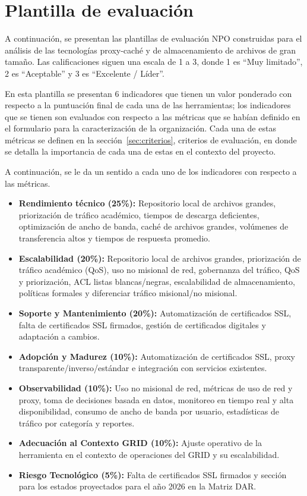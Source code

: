 \section{Plantilla de evaluación}\label{sec:plantilla}

A continuación, se presentan las plantillas de evaluación NPO
construidas para el análisis de las tecnologías proxy-caché y de
almacenamiento de archivos de gran tamaño. Las calificaciones siguen una
escala de 1 a 3, donde 1 es ``Muy limitado'', 2 es ``Aceptable'' y 3 es
``Excelente / Líder''.

En esta plantilla se presentan 6 indicadores que tienen un valor
ponderado con respecto a la puntuación final de cada una de las
herramientas; los indicadores que se tienen son evaluados con respecto a
las métricas que se habían definido en el formulario para la
caracterización de la organización. Cada una de estas métricas se
definen en la sección~\ref{sec:criterios}, criterios de evaluación, en donde se detalla la
importancia de cada una de estas en el contexto del proyecto.

A continuación, se le da un sentido a cada uno de los indicadores con
respecto a las métricas.

\begin{itemize}
\item \textbf{Rendimiento técnico (25\%):} Repositorio local de archivos grandes, priorización de tráfico académico, tiempos de descarga deficientes, optimización de ancho de banda, caché de archivos grandes, volúmenes de transferencia altos y tiempos de respuesta promedio.
\item \textbf{Escalabilidad (20\%):} Repositorio local de archivos grandes, priorización de tráfico académico (QoS), uso no misional de red, gobernanza del tráfico, QoS y priorización, ACL listas blancas/negras, escalabilidad de almacenamiento, políticas formales y diferenciar tráfico misional/no misional.
\item \textbf{Soporte y Mantenimiento (20\%):} Automatización de certificados SSL, falta de certificados SSL firmados, gestión de certificados digitales y adaptación a cambios.
\item \textbf{Adopción y Madurez (10\%):} Automatización de certificados SSL, proxy transparente/inverso/estándar e integración con servicios existentes.
\item \textbf{Observabilidad (10\%):} Uso no misional de red, métricas de uso de red y proxy, toma de decisiones basada en datos, monitoreo en tiempo real y alta disponibilidad, consumo de ancho de banda por usuario, estadísticas de tráfico por categoría y reportes.
\item \textbf{Adecuación al Contexto GRID (10\%):} Ajuste operativo de la herramienta en el contexto de operaciones del GRID y su escalabilidad.
\item \textbf{Riesgo Tecnológico (5\%):} Falta de certificados SSL firmados y sección para los estados proyectados para el año 2026 en la Matriz DAR.
\end{itemize}

